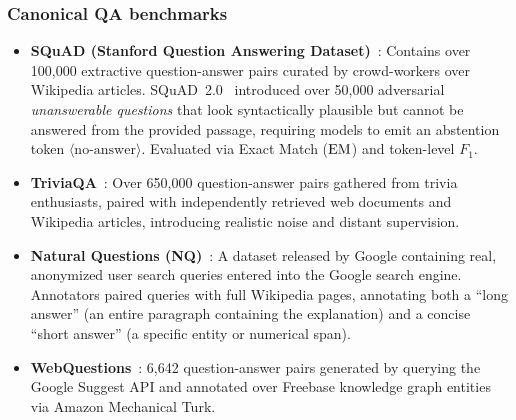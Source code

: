 \documentclass[../../../main.tex]{subfiles}
\begin{document}
\subsubsection{Canonical QA benchmarks}
\begin{itemize}
    \item \textbf{SQuAD (Stanford Question Answering Dataset)}~\cite{rajpurkar2016squad}: Contains over 100,000 extractive question-answer pairs curated by crowd-workers over Wikipedia articles. SQuAD~2.0~\cite{rajpurkar2018know} introduced over 50,000 adversarial \textit{unanswerable questions} that look syntactically plausible but cannot be answered from the provided passage, requiring models to emit an abstention token $\langle\text{no-answer}\rangle$. Evaluated via Exact Match ($\mathrm{EM}$) and token-level $F_1$.
    \item \textbf{TriviaQA}~\cite{joshi2017triviaqa}: Over 650,000 question-answer pairs gathered from trivia enthusiasts, paired with independently retrieved web documents and Wikipedia articles, introducing realistic noise and distant supervision.
    \item \textbf{Natural Questions (NQ)}~\cite{kwiatkowski2019natural}: A dataset released by Google containing real, anonymized user search queries entered into the Google search engine. Annotators paired queries with full Wikipedia pages, annotating both a ``long answer'' (an entire paragraph containing the explanation) and a concise ``short answer'' (a specific entity or numerical span).
    \item \textbf{WebQuestions}~\cite{berant2013webquestions}: 6,642 question-answer pairs generated by querying the Google Suggest API and annotated over Freebase knowledge graph entities via Amazon Mechanical Turk.
\end{itemize}
\end{document}
